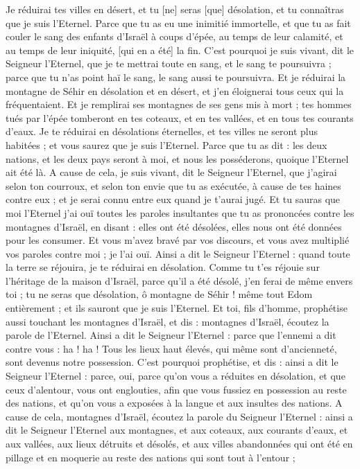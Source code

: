 \begin{multicols}{2}
Je réduirai tes villes en désert, et tu [ne] seras [que] désolation, et tu connaîtras que je suis l'Eternel.
Parce que tu as eu une inimitié immortelle, et que tu as fait couler le sang des enfants d'Israël à coups d'épée, au temps de leur calamité, et au temps de leur iniquité, [qui en a été] la fin.
C'est pourquoi je suis vivant, dit le Seigneur l'Eternel, que je te mettrai toute en sang, et le sang te poursuivra ; parce que tu n'as point haï le sang, le sang aussi te poursuivra.
Et je réduirai la montagne de Séhir en désolation et en désert, et j'en éloignerai tous ceux qui la fréquentaient.
Et je remplirai ses montagnes de ses gens mis à mort ; tes hommes tués par l'épée tomberont en tes coteaux, et en tes vallées, et en tous tes courants d'eaux.
Je te réduirai en désolations éternelles, et tes villes ne seront plus habitées ; et vous saurez que je suis l'Eternel.
Parce que tu as dit : les deux nations, et les deux pays seront à moi, et nous les posséderons, quoique l'Eternel ait été là.
A cause de cela, je suis vivant, dit le Seigneur l'Eternel, que j'agirai selon ton courroux, et selon ton envie que tu as exécutée, à cause de tes haines contre eux ; et je serai connu entre eux quand je t'aurai jugé.
Et tu sauras que moi l'Eternel j'ai ouï toutes les paroles insultantes que tu as prononcées contre les montagnes d'Israël, en disant : elles ont été désolées, elles nous ont été données pour les consumer.
Et vous m'avez bravé par vos discours, et vous avez multiplié vos paroles contre moi ; je l'ai ouï.
Ainsi a dit le Seigneur l'Eternel : quand toute la terre se réjouira, je te réduirai en désolation.
Comme tu t'es réjouie sur l'héritage de la maison d'Israël, parce qu'il a été désolé, j'en ferai de même envers toi ; tu ne seras que désolation, ô montagne de Séhir ! même tout Edom entièrement ; et ils sauront que je suis l'Eternel.
\VerseOne{}Et toi, fils d'homme, prophétise aussi touchant les montagnes d'Israël, et dis : montagnes d'Israël, écoutez la parole de l'Eternel.
Ainsi a dit le Seigneur l'Eternel : parce que l'ennemi a dit contre vous : ha ! ha ! Tous les lieux haut élevés, qui même sont d'ancienneté, sont devenus notre possession.
C'est pourquoi prophétise, et dis : ainsi a dit le Seigneur l'Eternel : parce, oui, parce qu'on vous a réduites en désolation, et que ceux d'alentour, vous ont englouties, afin que vous fussiez en possession au reste des nations, et qu'on vous a exposées à la langue et aux insultes des nations.
A cause de cela, montagnes d'Israël, écoutez la parole du Seigneur l'Eternel : ainsi a dit le Seigneur l'Eternel aux montagnes, et aux coteaux, aux courants d'eaux, et aux vallées, aux lieux détruits et désolés, et aux villes abandonnées qui ont été en pillage et en moquerie au reste des nations qui sont tout à l'entour ;

\end{multicols}
